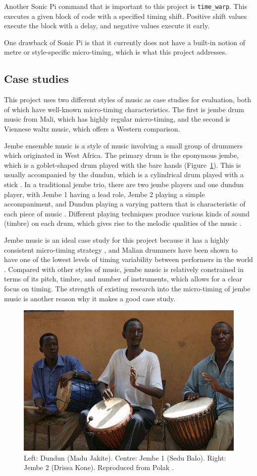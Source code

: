 \documentclass[12pt,twoside,openright]{report}
\begin{document}
Another Sonic Pi command that is important to this project is \verb'time_warp'. This executes a given block of code with a specified timing shift. Positive shift values execute the block with a delay, and negative values execute it early.

One drawback of Sonic Pi is that it currently does not have a built-in notion of
metre or style-specific micro-timing, which is what this project addresses.


\subsection{Case studies} \label{case_studies}

This project uses two different styles of music as case studies for evaluation,
both of which have well-known micro-timing characteristics. The first is jembe
drum music from Mali, which has highly regular micro-timing, and the second is
Viennese waltz music, which offers a Western comparison.

Jembe ensemble music is a style of music involving a small group of drummers
which originated in West Africa. The primary drum is the eponymous jembe, which
is a goblet-shaped drum played with the bare hands (Figure~\ref{fig:jembe_photo}). This is usually accompanied
by the dundun, which is a cylindrical drum played with a stick \cite{polak2010}. In a
traditional jembe trio, there are two jembe players and one dundun player, with
Jembe 1 having a lead role, Jembe 2 playing a simple accompaniment, and Dundun
playing a varying pattern that is characteristic of each piece of music
\cite{jacoby2021}. Different playing techniques produce various kinds of sound
(timbre) on each drum, which gives rise to the melodic qualities of the music
\cite{polak2010}.

Jembe music is an ideal case study for this project because it has a highly
consistent micro-timing strategy \cite{polak2010}, and Malian drummers have been shown to
have one of the lowest levels of timing variability between performers in the
world \cite{clayton2020}. Compared with other styles of music, jembe music is
relatively constrained in terms of its pitch, timbre, and number of instruments,
which allows for a clear focus on timing. The strength of existing research \cite{polak2010,london2017,jacoby2021} into the micro-timing of jembe music is another reason why it makes a good case study.

\begin{figure}[ht]
    \centering
    \includegraphics[width=0.5\linewidth]{figures/polak_ex1.jpg}
    \caption{Left: Dundun (Madu Jakite). Centre: Jembe 1 (Sedu Balo). Right: Jembe 2 (Drissa Kone). Reproduced from Polak \cite{polak2010}.}
    \label{fig:jembe_photo}
\end{figure}
\end{document}

